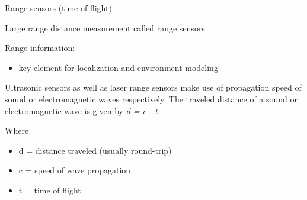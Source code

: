 \documentclass[compress]{beamer}
\begin{document}
\begin{frame}{Range sensors (time of flight)}

Large range distance measurement \rightarrow called range sensors

Range information:

\begin{itemize}

\item
  key element for localization and environment modeling
\end{itemize}

Ultrasonic sensors as well as laser range sensors make use of
propagation speed of sound or electromagnetic waves respectively. The
traveled distance of a sound or electromagnetic wave is given by \emph{d
= c . t}

Where

\begin{itemize}

\item
  d = distance traveled (usually round-trip)
\item
  c = speed of wave propagation
\item
  t = time of flight.
\end{itemize}

\end{frame}
\end{document}
